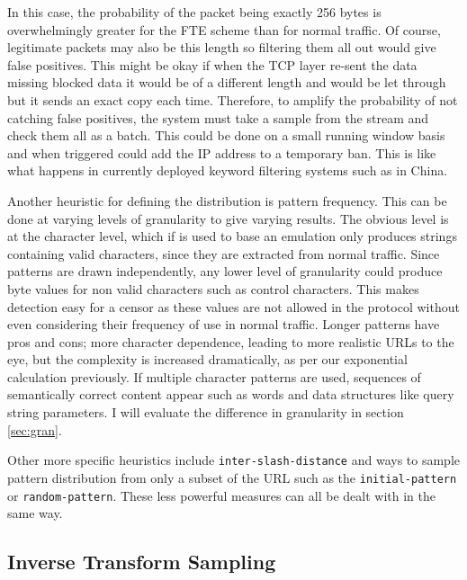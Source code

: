 \documentclass[10pt,a4paper]{article}
\begin{document}
In this case, the probability of the packet being exactly 256 bytes is overwhelmingly greater for the FTE scheme than for normal traffic. Of course, legitimate packets may also be this length so filtering them all out would give false positives. This might be okay if when the TCP layer re-sent the data missing blocked data it would be of a different length and would be let through but it sends an exact copy each time. Therefore, to amplify the probability of not catching false positives, the system must take a sample from the stream and check them all as a batch. This could be done on a small running window basis and when triggered could add the IP address to a temporary ban. This is like what happens in currently deployed keyword filtering systems such as in China. 

Another heuristic for defining the distribution is pattern frequency. This can be done at varying levels of granularity to give varying results. The obvious level is at the character level, which if is used to base an emulation only produces strings containing valid characters, since they are extracted from normal traffic. Since patterns are drawn independently, any lower level of granularity could produce byte values for non valid characters such as control characters. This makes detection easy for a censor as these values are not allowed in the protocol without even considering their frequency of use in normal traffic. Longer patterns have pros and cons; more character dependence, leading to more realistic URLs to the eye, but the complexity is increased dramatically, as per our exponential calculation previously. If multiple character patterns are used, sequences of semantically correct content appear such as words and data structures like query string parameters. I will evaluate the difference in granularity in section \ref{sec:gran}.

Other more specific heuristics include \texttt{inter-slash-distance} and ways to sample pattern distribution from only a subset of the URL such as the \texttt{initial-pattern} or \texttt{random-pattern}. These less powerful measures can all be dealt with in the same way.

\subsection{Inverse Transform Sampling}
\end{document}
